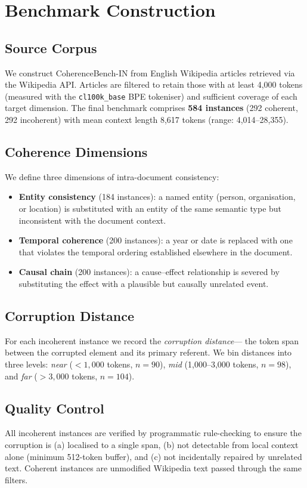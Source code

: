 \documentclass{llncs}
\begin{document}
\section{Benchmark Construction}
\subsection{Source Corpus}
We construct CoherenceBench-IN from English Wikipedia articles
retrieved via the Wikipedia API.
Articles are filtered to retain those with at least 4{,}000 tokens
(measured with the \texttt{cl100k\_base} BPE tokeniser)
and sufficient coverage of each target dimension.
The final benchmark comprises \textbf{584 instances}
(292 coherent, 292 incoherent)
with mean context length 8,617 tokens
(range: 4,014--28,355).

\subsection{Coherence Dimensions}
We define three dimensions of intra-document consistency:
\begin{itemize}
    \item \textbf{Entity consistency} (184 instances):
          a named entity (person, organisation, or location) is substituted
          with an entity of the same semantic type but inconsistent with the document context.
    \item \textbf{Temporal coherence} (200 instances):
          a year or date is replaced with one that violates the temporal ordering
          established elsewhere in the document.
    \item \textbf{Causal chain} (200 instances):
          a cause--effect relationship is severed by substituting the effect
          with a plausible but causally unrelated event.
\end{itemize}

\subsection{Corruption Distance}
For each incoherent instance we record the \emph{corruption distance}---
the token span between the corrupted element and its primary referent.
We bin distances into three levels:
\emph{near} ($< 1{,}000$ tokens, $n=90$),
\emph{mid} (1{,}000--3{,}000 tokens, $n=98$), and
\emph{far} ($> 3{,}000$ tokens, $n=104$).

\subsection{Quality Control}
All incoherent instances are verified by programmatic rule-checking to ensure
the corruption is (a) localised to a single span, (b) not detectable from
local context alone (minimum 512-token buffer), and
(c) not incidentally repaired by unrelated text.
Coherent instances are unmodified Wikipedia text passed through the same filters.
\end{document}
